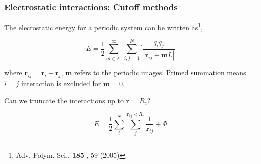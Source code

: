 \documentclass{beamer}
\begin{document}
\begin{frame}\frametitle{Electrostatic interactions: Cutoff methods}

The elecrostatic energy for a periodic system can be written as\footnote{{\scriptsize Adv. Polym. Sci.,  {\bf
185 }, 59 (2005)}},

\begin{equation}
	E= \frac{1}{2} \sum_{m \in \mathbb{Z}^3}^{\infty} \sum_{i,j=1}^{N}{}^{'} \frac{q_i q_j}{ |\mathbf{r}_{ij} + \mathbf{m}L| }
\end{equation}

where $\mathbf{r}_{ij} = \mathbf{r}_i -   \mathbf{r}_j$, $\mathbf{m}$ refers to the periodic 
images. Primed summation means $i=j$ interaction is excluded for $\mathbf{m}=0$.

Can we truncate the interactions up to $\mathbf{r}=R_c$?

\begin{equation}
	E =  \frac{1}{2} \sum_i^N \sum_{j}^{\mathbf{r}_{ij}<R_c} \frac{1}{\mathbf{r}_{ij}}  + \Phi 
\end{equation}

\end{frame}

\end{document}

